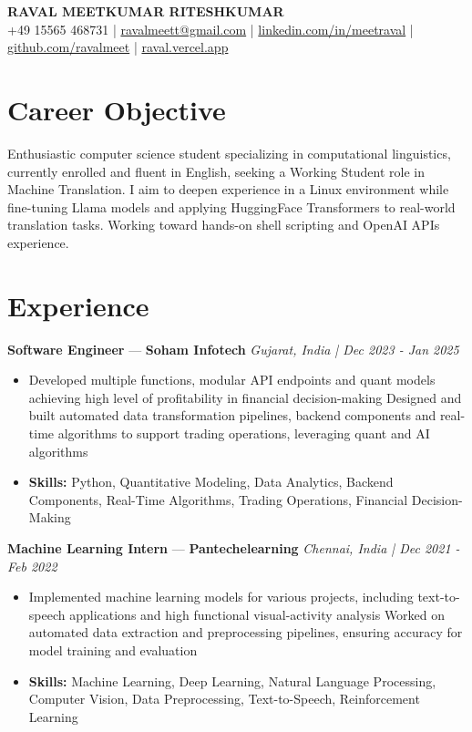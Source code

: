 \documentclass[a4paper,10pt]{article}
\begin{document}
\begin{center}
  {\Large\bfseries RAVAL MEETKUMAR RITESHKUMAR}\\[2pt]
  {\small +49 15565 468731 \;|\; \href{mailto:ravalmeett@gmail.com}{ravalmeett@gmail.com} \;|\; \href{https://www.linkedin.com/in/meetraval/}{linkedin.com/in/meetraval} \;|\; \href{https://github.com/ravalmeet}{github.com/ravalmeet} \;|\; \href{https://raval.vercel.app/}{raval.vercel.app}}
\end{center}
\vspace{-3pt}

\section*{Career Objective}
Enthusiastic computer science student specializing in computational linguistics, currently enrolled and fluent in English, seeking a Working Student role in Machine Translation. I aim to deepen experience in a Linux environment while fine-tuning Llama models and applying HuggingFace Transformers to real-world translation tasks. Working toward hands-on shell scripting and OpenAI APIs experience.\par

\section*{Experience}
\textbf{Software Engineer} — \textbf{Soham Infotech} \hfill \textit{Gujarat, India \;|\; Dec 2023 - Jan 2025}\par
\vspace{1pt}
\begin{itemize}
  \item Developed multiple functions, modular API endpoints and quant models achieving high level of profitability in financial decision-making Designed and built automated data transformation pipelines, backend components and real-time algorithms to support trading operations, leveraging quant and AI algorithms
  \item \textbf{Skills:} Python, Quantitative Modeling, Data Analytics, Backend Components, Real-Time Algorithms, Trading Operations, Financial Decision-Making
\end{itemize}
\vspace{3pt}
\textbf{Machine Learning Intern} — \textbf{Pantechelearning} \hfill \textit{Chennai, India \;|\; Dec 2021 - Feb 2022}\par
\vspace{1pt}
\begin{itemize}
  \item Implemented machine learning models for various projects, including text-to-speech applications and high functional visual-activity analysis Worked on automated data extraction and preprocessing pipelines, ensuring accuracy for model training and evaluation
  \item \textbf{Skills:} Machine Learning, Deep Learning, Natural Language Processing, Computer Vision, Data Preprocessing, Text-to-Speech, Reinforcement Learning
\end{itemize}
\end{document}

